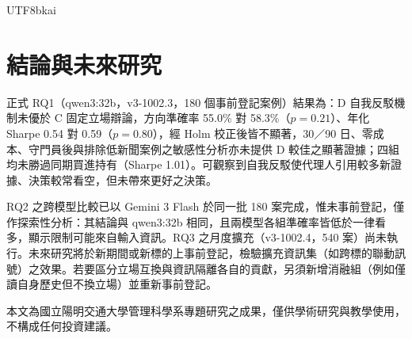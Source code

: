 \documentclass[12pt,a4paper]{article}
\newcommand{\grp}[1]{\textsf{#1}}
\begin{document}
\begin{CJK}{UTF8}{bkai}
\section{結論與未來研究}
\label{sec:conclusion}

正式 RQ1（qwen3:32b，v3-1002.3，180 個事前登記案例）結果為：\grp{D} 自我反駁機制未優於 \grp{C} 固定立場辯論，方向準確率 55.0\% 對 58.3\%（$p=0.21$）、年化 Sharpe 0.54 對 0.59（$p=0.80$），經 Holm 校正後皆不顯著，30／90 日、零成本、守門員後與排除低新聞案例之敏感性分析亦未提供 D 較佳之顯著證據；四組均未勝過同期買進持有（Sharpe 1.01）。可觀察到自我反駁使代理人引用較多新證據、決策較常看空，但未帶來更好之決策。


RQ2 之跨模型比較已以 Gemini 3 Flash 於同一批 180 案完成，惟未事前登記，僅作探索性分析：其結論與 qwen3:32b 相同，且兩模型各組準確率皆低於一律看多，顯示限制可能來自輸入資訊。RQ3 之月度擴充（v3-1002.4，540 案）尚未執行。未來研究將於新期間或新標的上事前登記，檢驗擴充資訊集（如跨標的聯動訊號）之效果。若要區分立場互換與資訊隔離各自的貢獻，另須新增消融組（例如僅讀自身歷史但不換立場）並重新事前登記。

\vspace{0.8cm}
\noindent\small 本文為國立陽明交通大學管理科學系專題研究之成果，僅供學術研究與教學使用，不構成任何投資建議。
\normalsize

\clearpage



\clearpage
\end{CJK}
\end{document}

